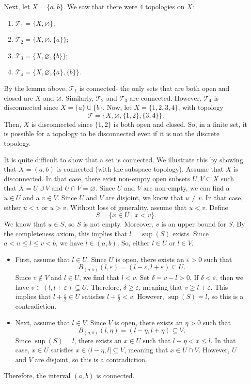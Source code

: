 \documentclass[a4paper, openany]{memoir}
\theoremstyle{definition}
\theoremstyle{plain}
\begin{document}
Next, let $X = \{a, b\}$. We saw that there were 4 topologies on $X$:
\begin{enumerate}
    \item $\mathcal{T}_1 = \{X, \varnothing\}$;
    \item $\mathcal{T}_2 = \{X, \varnothing, \{a\}\}$;
    \item $\mathcal{T}_3 = \{X, \varnothing, \{b\}\}$;
    \item $\mathcal{T}_4 = \{X, \varnothing, \{a\}, \{b\}\}$.
\end{enumerate}
By the lemma above, $\mathcal{T}_1$ is connected- the only sets that are both open and closed are $X$ and $\varnothing$. Similarly, $\mathcal{T}_2$ and $\mathcal{T}_3$ are connected. However, $\mathcal{T}_4$ is disconnected since $X = \{a\} \cup \{b\}$. Now, let $X = \{1, 2, 3, 4\}$, with topology
\[\mathcal{T} = \{X, \varnothing, \{1, 2\}, \{3, 4\}\}.\]
Then, $X$ is disconnected since $\{1, 2\}$ is both open and closed. So, in a finite set, it is possible for a topology to be disconnected even if it is not the discrete topology.

It is quite difficult to show that a set is connected. We illustrate this by showing that $X = (a, b)$ is connected (with the subspace topology). Assume that $X$ is disconnected. In that case, there exist non-empty open subsets $U, V \subseteq X$ such that $X = U \cup V$ and $U \cap V = \varnothing$. Since $U$ and $V$ are non-empty, we can find a $u \in U$ and a $v \in V$. Since $U$ and $V$ are disjoint, we know that $u \neq v$. In that case, either $u < v$ or $u > v$. Without loss of generality, assume that $u < v$. Define
\[S = \{x \in U \mid x < v\}.\]
We know that $u \in S$, so $S$ is not empty. Moreover, $v$ is an upper bound for $S$. By the completeness axiom, this implies that $l = \sup(S)$ exists. Since $a < u \leqslant l \leqslant v < b$, we have $l \in (a, b)$. So, either $l \in U$ or $l \in V$. 
\begin{itemize}
    \item First, assume that $l \in U$. Since $U$ is open, there exists an $\varepsilon > 0$ such that 
    \[B_{(a, b)}(l, \varepsilon) = (l - \varepsilon, l + \varepsilon) \subseteq U.\]
    Since $v \not\in V$ and $l \in U$, we find that $l < v$. Set $\delta = v - l > 0$. If $\delta < \varepsilon$, then we have $v \in (l, l+\varepsilon) \subseteq U$. Therefore, $\delta \geqslant \varepsilon$, meaning that $v \geqslant l + \varepsilon$. This implies that $l + \frac{\varepsilon}{2} \in U$ satisfies $l + \frac{\varepsilon}{2} < v$. However, $\sup (S) = l$, so this is a contradiction.
    
    \item Next, assume that $l \in V$. Since $V$ is open, there exists an $\eta > 0$ such that
    \[B_{(a, b)}(l, \eta) = (l - \eta, l + \eta) \subseteq V.\]
    Since $\sup (S) = l$, there exists an $x \in U$ such that $l - \eta < x \leqslant l$. In that case, $x \in U$ satisfies $x \in (l - \eta, l] \subseteq V$, meaning that $x \in U \cap V$. However, $U$ and $V$ are disjoint, so this is a contradiction.
\end{itemize}
Therefore, the interval $(a, b)$ is connected.
\end{document}
